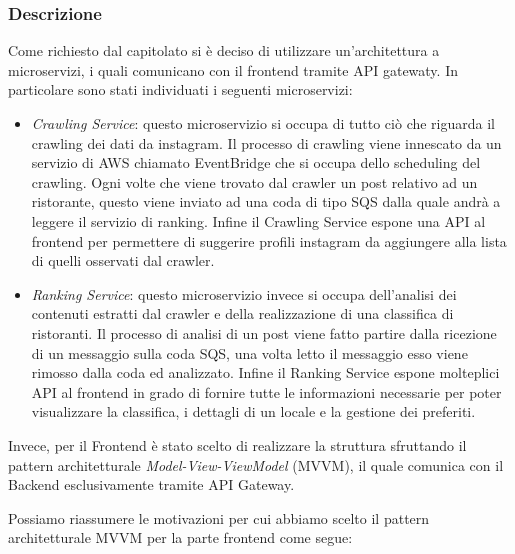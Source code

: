 \subsubsection{Descrizione}
Come richiesto dal capitolato si è deciso di utilizzare un'architettura a microservizi, i quali comunicano con il frontend tramite API gatewaty.
In particolare sono stati individuati i seguenti microservizi:
\begin{itemize}
    \item \textit{Crawling Service}: questo microservizio si occupa di tutto ciò che riguarda il crawling dei dati da instagram. Il processo di crawling viene innescato da un servizio di AWS chiamato EventBridge che si occupa dello scheduling del crawling. Ogni volte che viene trovato dal crawler un post relativo ad un ristorante, questo viene inviato ad una coda di tipo SQS dalla quale andrà a leggere il servizio di ranking. Infine il Crawling Service espone una API al frontend per permettere di suggerire profili instagram da aggiungere alla lista di quelli osservati dal crawler.
    \item \textit{Ranking Service}: questo microservizio invece si occupa dell'analisi dei contenuti estratti dal crawler e della realizzazione di una classifica di ristoranti. Il processo di analisi di un post viene fatto partire dalla ricezione di un messaggio sulla coda SQS, una volta letto il messaggio esso viene rimosso dalla coda ed analizzato. Infine il Ranking Service espone molteplici API al frontend in grado di fornire tutte le informazioni necessarie per poter visualizzare la classifica, i dettagli di un locale e la gestione dei preferiti.
\end{itemize}

Invece, per il Frontend è stato scelto di realizzare la struttura sfruttando il pattern architetturale \textit{Model-View-ViewModel} (MVVM), il quale comunica con il Backend esclusivamente tramite API Gateway.

Possiamo riassumere le motivazioni per cui abbiamo scelto il pattern architetturale MVVM per la parte frontend come segue:

